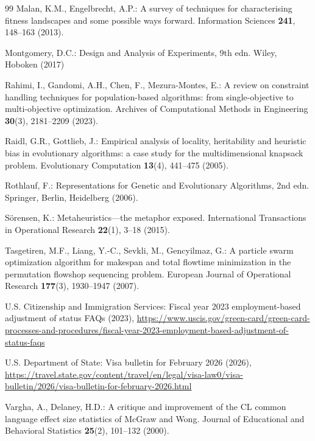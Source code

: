 \documentclass[runningheads]{llncs}
\begin{document}
\begin{thebibliography}{99}
Malan, K.M., Engelbrecht, A.P.: A survey of techniques for characterising fitness landscapes and some possible ways forward. Information Sciences \textbf{241}, 148--163 (2013). 

Montgomery, D.C.: Design and Analysis of Experiments, 9th edn. Wiley, Hoboken (2017)

Rahimi, I., Gandomi, A.H., Chen, F., Mezura-Montes, E.: A review on constraint handling techniques for population-based algorithms: from single-objective to multi-objective optimization. Archives of Computational Methods in Engineering \textbf{30}(3), 2181--2209 (2023). 

Raidl, G.R., Gottlieb, J.: Empirical analysis of locality, heritability and heuristic bias in evolutionary algorithms: a case study for the multidimensional knapsack problem. Evolutionary Computation \textbf{13}(4), 441--475 (2005). 

Rothlauf, F.: Representations for Genetic and Evolutionary Algorithms, 2nd edn. Springer, Berlin, Heidelberg (2006). 

S\"orensen, K.: Metaheuristics---the metaphor exposed. International Transactions in Operational Research \textbf{22}(1), 3--18 (2015). 

Tasgetiren, M.F., Liang, Y.-C., Sevkli, M., Gencyilmaz, G.: A particle swarm optimization algorithm for makespan and total flowtime minimization in the permutation flowshop sequencing problem. European Journal of Operational Research \textbf{177}(3), 1930--1947 (2007). 

U.S. Citizenship and Immigration Services: Fiscal year 2023 employment-based adjustment of status FAQs (2023), \url{https://www.uscis.gov/green-card/green-card-processes-and-procedures/fiscal-year-2023-employment-based-adjustment-of-status-faqs}

U.S. Department of State: Visa bulletin for February 2026 (2026), \url{https://travel.state.gov/content/travel/en/legal/visa-law0/visa-bulletin/2026/visa-bulletin-for-february-2026.html}

Vargha, A., Delaney, H.D.: A critique and improvement of the CL common language effect size statistics of McGraw and Wong. Journal of Educational and Behavioral Statistics \textbf{25}(2), 101--132 (2000). 


\end{thebibliography}
\end{document}
